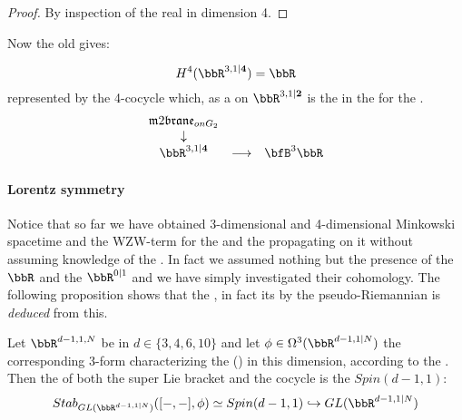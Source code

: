 \begin{proof}
By inspection of the real  in dimension 4.
\end{proof}
Now the old  gives:
\begin{prop}
\label{TheStringIn4d}\hypertarget{TheStringIn4d}{}
\begin{displaymath}
H^4(\bbR^{3,1\vert \mathbf{4}}) = \bbR
\end{displaymath}
represented by the 4-cocycle which, as a   on $\bbR^{3,1\vert \mathbf{2}}$ is the  in the  for the .
\begin{displaymath}
\itexarray{
\mathfrak{m}2\mathfrak{brane}_{onG_2}
\\
\downarrow
\\
\bbR^{3,1\vert  \mathbf{4} }
&\stackrel{}{\longrightarrow}&
\bfB^3 \bbR
}
\end{displaymath}
\end{prop}
\hypertarget{lorentz_symmetry}{}\paragraph*{{Lorentz symmetry}}\label{lorentz_symmetry}
Notice that so far we have obtained 3-dimensional and 4-dimensional Minkowski spacetime and the WZW-term for the  and the  propagating on it without assuming knowledge of the . In fact we assumed nothing but the presence of the  $\bbR$ and the  $\bbR^{0|1}$ and we have simply investigated their cohomology.
The following proposition shows that the , in fact its  by the pseudo-Riemannian  is \emph{deduced} from this.
\begin{prop}
\label{StabilizerOfSupersymmetryJointWith3Cocycle}\hypertarget{StabilizerOfSupersymmetryJointWith3Cocycle}{}
Let $\bbR^{d-1,1,N}$ be  in  $d \in \{3,4,6,10\}$ and let $\phi \in \Omega^{3}(\bbR^{d-1,1|N})$ the corresponding 3-form characterizing the  () in this dimension, according to the  . Then the  of both the super Lie bracket and the cocycle is the  $Spin(d-1,1)$:
\begin{displaymath}
Stab_{GL(\bbR^{d-1,1|N})}([-,-], \phi)
\simeq
Spin(d-1,1) \hookrightarrow GL(\bbR^{d-1,1|N})
\end{displaymath}
\end{prop}
